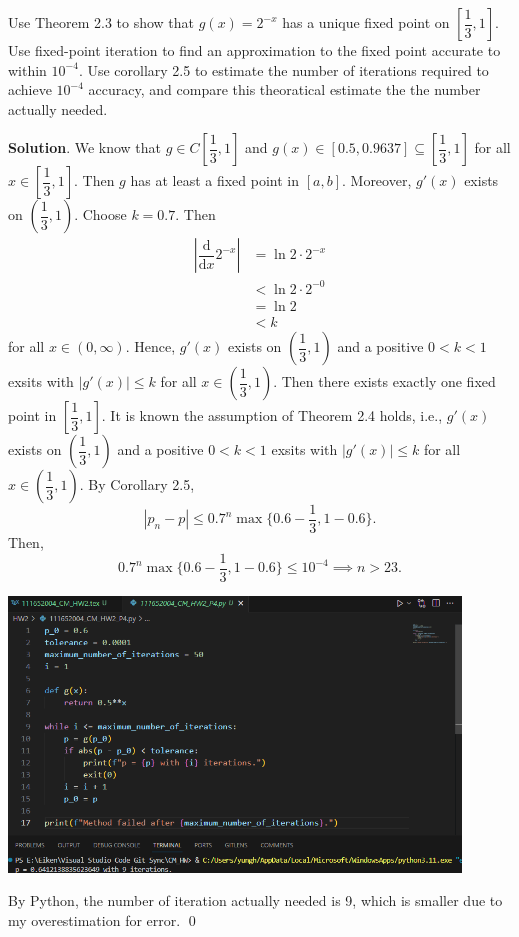 \documentclass[11pt]{article}
\theoremstyle{break}
\newcommand{\dd}{\text{d}}
\numberwithin{equation}{theorem}
\begin{document}
\newpage
\begin{problem}\label{problem 4}
    Use Theorem 2.3 to show that $g(x)=2^{-x}$ has a unique fixed point on $\left[\dfrac{1}{3}, 1\right]$. Use fixed-point iteration to find an approximation to the fixed point accurate to within $10^{-4}$. Use corollary 2.5 to estimate the number of iterations required to achieve $10^{-4}$ accuracy, and compare this theoratical estimate the the number actually needed.
\end{problem}
\textbf{Solution}. We know that $g\in C\left[\dfrac{1}{3}, 1\right]$ and $g(x)\in[0.5, 0.9637]\subseteq\left[\dfrac{1}{3}, 1\right]$ for all $x\in\left[\dfrac{1}{3}, 1\right]$. Then $g$ has at least a fixed point in $[a, b]$. Moreover, $g'(x)$ exists on $\left(\dfrac{1}{3}, 1\right)$. Choose $k=0.7$. Then
\begin{align*}
    \left|\dfrac{\dd}{\dd x}2^{-x}\right|&=\ln2\cdot 2^{-x}\\
    &<\ln2\cdot 2^{-0}\\
    &=\ln2\\
    &<k
\end{align*}
for all $x\in(0, \infty)$. Hence, $g'(x)$ exists on $\left(\dfrac{1}{3}, 1\right)$ and a positive $0<k<1$ exsits with $\left|g'(x)\right|\leq k$ for all $x\in\left(\dfrac{1}{3}, 1\right)$. Then there exists exactly one fixed point in $\left[\dfrac{1}{3}, 1\right]$. It is known the assumption of Theorem 2.4 holds, i.e., $g'(x)$ exists on $\left(\dfrac{1}{3}, 1\right)$ and a positive $0<k<1$ exsits with $\left|g'(x)\right|\leq k$ for all $x\in\left(\dfrac{1}{3}, 1\right)$. By Corollary 2.5, 
\begin{equation*}
    |p_n-p|\leq 0.7^n\max\{0.6-\dfrac{1}{3}, 1-0.6\}.
\end{equation*}
Then,
\begin{equation*}
    0.7^n\max\{0.6-\dfrac{1}{3}, 1-0.6\}\leq 10^{-4} \implies n>23.
\end{equation*}

\begin{center}
    \includegraphics[width=0.9\textwidth]{problem_4_py.png}
\end{center}
By Python, the number of iteration actually needed is 9, which is smaller due to my overestimation for error. \qed
\end{document}
